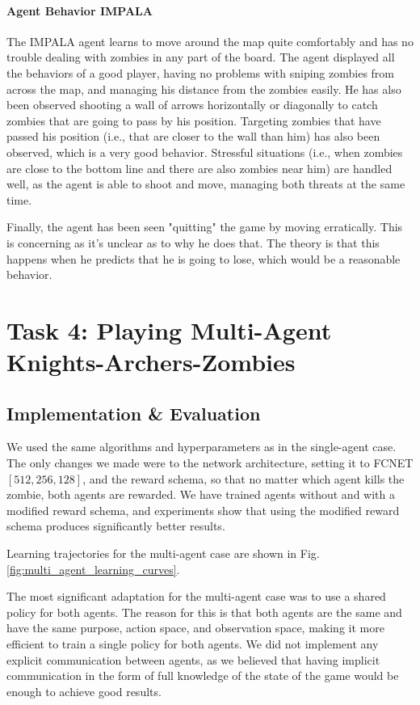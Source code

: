 \documentclass[12pt,a4paper, onecolumn]{exam}
\begin{document}
\paragraph{Agent Behavior IMPALA}
The IMPALA agent learns to move around the map quite comfortably and has no trouble dealing with zombies in any part of the board.
The agent displayed all the behaviors of a good player, having no problems with sniping zombies from across the map, and managing his distance from the zombies easily.
He has also been observed shooting a wall of arrows horizontally or diagonally to catch zombies that are going to pass by his position.
Targeting zombies that have passed his position (i.e., that are closer to the wall than him) has also been observed, which is a very good behavior.
Stressful situations (i.e., when zombies are close to the bottom line and there are also zombies near him) are handled well, as the agent is able to shoot and move,
managing both threats at the same time.

Finally, the agent has been seen "quitting" the game by moving erratically. This is concerning as it's unclear as to why he does that. %
The theory is that this happens when he predicts that he is going to lose, which would be a reasonable behavior.

\section{\textbf{Task 4: Playing Multi-Agent Knights-Archers-Zombies}}

\subsection{Implementation \& Evaluation}

We used the same algorithms and hyperparameters as in the single-agent case. The only changes we made were
to the network architecture, setting it to FCNET$[512,256,128]$, and the reward schema,
so that no matter which agent kills the zombie, both agents are rewarded.
We have trained agents without and with a modified reward schema, and experiments show that using the modified
reward schema produces significantly better results.

Learning trajectories for the multi-agent case are shown in Fig. \ref{fig:multi_agent_learning_curves}.

The most significant adaptation for the multi-agent case was to use a shared policy for both agents.
The reason for this is that both agents are the same and have the same purpose, action space, and observation
space, making it more efficient to train a single policy for both agents. We did not implement any explicit
communication between agents, as we believed that having implicit communication in the form of full knowledge
of the state of the game would be enough to achieve good results.
\end{document}
